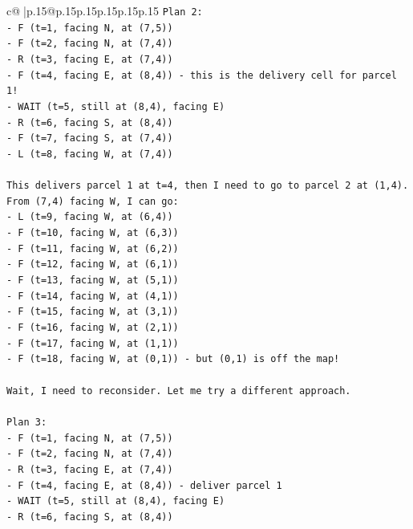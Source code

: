 \documentclass{article}
\begin{document}
{\begin{supertabular}{c@{$\;$}|p{.15\linewidth}@{}p{.15\linewidth}p{.15\linewidth}p{.15\linewidth}p{.15\linewidth}p{.15\linewidth}}
{{{\texttt{Plan 2:} \\
\texttt{{-} F (t=1, facing N, at (7,5))} \\
\texttt{{-} F (t=2, facing N, at (7,4))} \\
\texttt{{-} R (t=3, facing E, at (7,4))} \\
\texttt{{-} F (t=4, facing E, at (8,4)) {-} this is the delivery cell for parcel 1!} \\
\texttt{{-} WAIT (t=5, still at (8,4), facing E)} \\
\texttt{{-} R (t=6, facing S, at (8,4))} \\
\texttt{{-} F (t=7, facing S, at (7,4))} \\
\texttt{{-} L (t=8, facing W, at (7,4))} \\
\\ 
\texttt{This delivers parcel 1 at t=4, then I need to go to parcel 2 at (1,4). From (7,4) facing W, I can go:} \\
\texttt{{-} L (t=9, facing W, at (6,4))} \\
\texttt{{-} F (t=10, facing W, at (6,3))} \\
\texttt{{-} F (t=11, facing W, at (6,2))} \\
\texttt{{-} F (t=12, facing W, at (6,1))} \\
\texttt{{-} F (t=13, facing W, at (5,1))} \\
\texttt{{-} F (t=14, facing W, at (4,1))} \\
\texttt{{-} F (t=15, facing W, at (3,1))} \\
\texttt{{-} F (t=16, facing W, at (2,1))} \\
\texttt{{-} F (t=17, facing W, at (1,1))} \\
\texttt{{-} F (t=18, facing W, at (0,1)) {-} but (0,1) is off the map!} \\
\\ 
\texttt{Wait, I need to reconsider. Let me try a different approach.} \\
\\ 
\texttt{Plan 3:} \\
\texttt{{-} F (t=1, facing N, at (7,5))} \\
\texttt{{-} F (t=2, facing N, at (7,4))} \\
\texttt{{-} R (t=3, facing E, at (7,4))} \\
\texttt{{-} F (t=4, facing E, at (8,4)) {-} deliver parcel 1} \\
\texttt{{-} WAIT (t=5, still at (8,4), facing E)} \\
\texttt{{-} R (t=6, facing S, at (8,4))} \\
}}}
\end{supertabular}}
\end{document}
